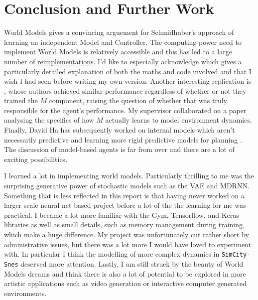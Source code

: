 \documentclass{article}
\numberwithin{figure}{section}
\theoremstyle{definition}
\begin{document}
\section{Conclusion and Further Work}
World Models gives a convincing arguement for Schmidhuber's approach of learning an independent Model and Controller.
The computing power need to implement World Models is relatively accessible and this has led to a large number of \href{https://paperswithcode.com/paper/world-models}{reimplementations}.
I'd like to especially acknowledge \cite{green2020} which gives a particularly detailed explanation of both the maths and code involved and that I wish I had seen before writing my own version.
Another interesting replication is \cite{ctallec}, whose authors achieved similar performance regardless of whether or not they trained the $M$ component, raising the question of whether that was truly responsible for the agent's performance.
My supervisor collaborated on a paper \citep{DBLP:journals/corr/abs-1901-07859} analysing the specifics of how $M$ actually learns to model environment dynamics.
Finally, David Ha has subsequently worked on internal models which aren't necessarily predictive \citep{freeman2019learning} and learning more rigid predictive models for planning \citep{pmlr-v97-hafner19a}.
The discussion of model-based agents is far from over and there are a lot of exciting possibilities.

I learned a lot in implementing world models.
Particularly thrilling to me was the surprising generative power of stochastic models such as the VAE and MDRNN.
Something that is less reflected in this report is that having never worked on a larger scale neural net based project before a lot of the the learning for me was practical.
I became a lot more familiar with the Gym, Tensorflow, and Keras libraries as well as small details, such as memory management during training, which make a huge difference.
My project was unfortunately cut rather short by administrative issues, but there was a lot more I would have loved to experiment with.
In particular I think the modelling of more complex dynamics in \texttt{SimCity-Snes} deserved more attention.
Lastly, I am still struck by the beauty of World Models dreams and think there is also a lot of potential to be explored in more artistic applications such as video generation or interactive computer generated environments.






\clearpage
 
\end{document}
